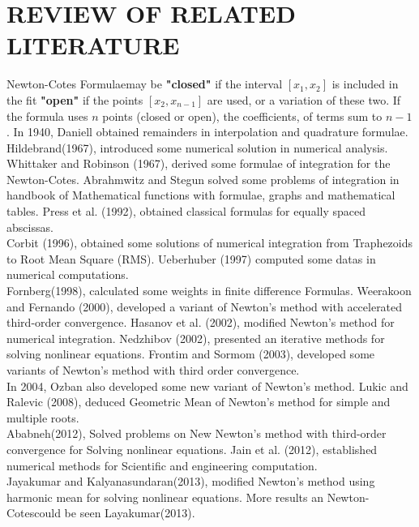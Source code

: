 \documentclass[12pt]{report}
\newcommand{\sps}{\\[0.2cm]}
\newcommand{\bt}[1]{\textbf{#1}}
\newcommand{\NCF}{Newton-Cotes Formulae}
\newcommand{\NC}{Newton-Cotes}
\begin{document}
	\section{REVIEW OF RELATED LITERATURE}
	\NCF may be \bt{"closed"} if the interval $[x_1, x_2]$ is included in the fit \bt{"open"} if the points $[x_2, x_{n-1}]$ are used, or a variation of these two. If the formula uses $n$ points (closed or open), the coefficients, of terms sum to $n-1$. In 1940, Daniell obtained remainders in interpolation and quadrature formulae. Hildebrand(1967), introduced some numerical solution in numerical analysis. Whittaker and Robinson (1967), derived some formulae of integration for the \NC. Abrahmwitz and Stegun solved some problems of integration in handbook of Mathematical functions with formulae, graphs and mathematical tables. Press et al. (1992), obtained classical formulas for equally spaced abscissas.\sps
	Corbit (1996), obtained some solutions of numerical integration from Traphezoids to Root Mean Square (RMS). Ueberhuber (1997) computed some datas in numerical computations.\sps
	Fornberg(1998), calculated some weights in finite difference Formulas. Weerakoon and Fernando (2000), developed a variant of Newton's method with accelerated third-order convergence. Hasanov et al. (2002), modified Newton's method for numerical integration. Nedzhibov (2002), presented an iterative methods for solving nonlinear equations. Frontim and Sormom (2003), developed some variants of Newton's method with third order convergence.\sps
	In 2004, Ozban also developed some new variant of Newton's method. Lukic and Ralevic (2008), deduced Geometric Mean of Newton's method for simple and multiple roots.\sps
	Ababneh(2012), Solved problems on New Newton's method with third-order convergence for Solving nonlinear equations. Jain et al. (2012), established numerical methods for Scientific and engineering computation.\sps
	Jayakumar and Kalyanasundaran(2013), modified Newton's method using harmonic mean for solving nonlinear equations. More results an \NC could be seen Layakumar(2013).
	
\end{document}
